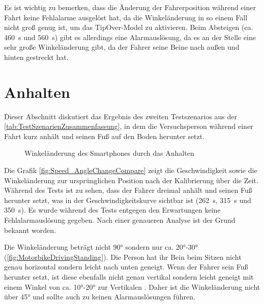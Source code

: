 

Es ist wichtig zu bemerken, dass die Änderung der Fahrerposition während einer Fahrt keine Fehlalarme ausgelöst hat, da die Winkeländerung in so einem Fall nicht groß genug ist, um das \glqq TipOver\grqq{}-Model zu aktivieren. Beim Absteigen (ca. \SI{460}{\second} und \SI{560}{\second}) gibt es allerdings eine Alarmauslösung, da es an der Stelle eine sehr große Winkeländerung gibt, da der Fahrer seine Beine nach außen und hinten gestreckt hat.
\section{Anhalten}
Dieser Abschnitt diskutiert das Ergebnis des zweiten Testszenarios aus der \autoref{tab:TestSzenarienZusammenfassung}, in dem die Versuchsperson während einer Fahrt kurz anhält und seinen Fuß auf den Boden herunter setzt.

\begin{figure}[htpb]
	\centering
	\caption{Winkeländerung des Smartphones durch das Anhalten}
	\label{fig:Speed_AngleChangeCompare}
\end{figure}
Die Grafik \autoref{fig:Speed_AngleChangeCompare} zeigt die Geschwindigkeit sowie die Winkeländerung zur ursprünglichen Position nach der Kalibrierung über die Zeit.
Während des Tests ist zu sehen, dass der Fahrer dreimal anhält und seinen Fuß herunter setzt, was in der Geschwindigkeitskurve sichtbar ist (\SI{262}{\second}, \SI{315}{\second} und \SI{350}{\second}). Es wurde während des Tests entgegen den Erwartungen keine Fehlalarmauslösung gegeben. Nach einer genaueren Analyse ist der Grund bekannt worden.

Die Winkeländerung beträgt nicht \ang{90} sondern nur ca. \ang{20}-\ang{30} (\autoref{fig:MotorbikeDrivingStanding}). Die Person hat ihr Bein beim Sitzen nicht genau horizontal sondern leicht nach unten geneigt. Wenn der Fahrer sein Fuß herunter setzt, ist diese ebenfalls nicht genau vertikal sondern leicht geneigt mit einem Winkel von ca. \ang{10}-\ang{20} zur Vertikalen . Daher ist die Winkeländerung nicht über \ang{45} und sollte auch zu keinen Alarmauslösungen führen.

